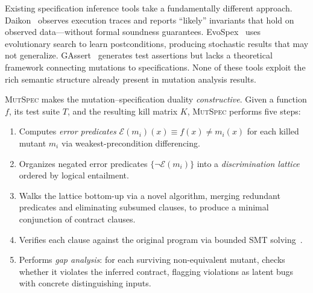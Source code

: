 \documentclass[11pt]{article}
\begin{document}
Existing specification inference tools take a fundamentally different approach.
Daikon~\cite{ernst2007} observes execution traces and reports ``likely''
invariants that hold on observed data---without formal soundness guarantees.
EvoSpex~\cite{molina2021} uses evolutionary search to learn postconditions,
producing stochastic results that may not generalize. GAssert~\cite{terragni2021}
generates test assertions but lacks a theoretical framework connecting mutations
to specifications. None of these tools exploit the rich semantic structure
already present in mutation analysis results.

\textsc{MutSpec} makes the mutation--specification duality \emph{constructive}.
Given a function $f$, its test suite $T$, and the resulting kill matrix $K$,
\textsc{MutSpec} performs five steps:
\begin{enumerate}[leftmargin=*]
  \item Computes \emph{error predicates} $\mathcal{E}(m_i)(x) \equiv f(x) \neq m_i(x)$
        for each killed mutant $m_i$ via weakest-precondition differencing.
  \item Organizes negated error predicates $\{\neg\mathcal{E}(m_i)\}$ into a
        \emph{discrimination lattice} ordered by logical entailment.
  \item Walks the lattice bottom-up via a novel algorithm, merging redundant
        predicates and eliminating subsumed clauses, to produce a minimal
        conjunction of contract clauses.
  \item Verifies each clause against the original program via bounded SMT
        solving~\cite{demoura2008}.
  \item Performs \emph{gap analysis}: for each surviving non-equivalent mutant,
        checks whether it violates the inferred contract, flagging violations as
        latent bugs with concrete distinguishing inputs.
\end{enumerate}
\end{document}
